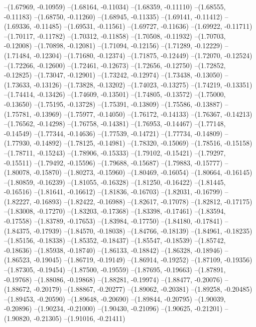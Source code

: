--(1.67969, -0.10959)
--(1.68164, -0.11034)
--(1.68359, -0.11110)
--(1.68555, -0.11183)
--(1.68750, -0.11260)
--(1.68945, -0.11335)
--(1.69141, -0.11412)
--(1.69336, -0.11485)
--(1.69531, -0.11561)
--(1.69727, -0.11636)
--(1.69922, -0.11711)
--(1.70117, -0.11782)
--(1.70312, -0.11858)
--(1.70508, -0.11932)
--(1.70703, -0.12008)
--(1.70898, -0.12081)
--(1.71094, -0.12156)
--(1.71289, -0.12229)
--(1.71484, -0.12304)
--(1.71680, -0.12374)
--(1.71875, -0.12449)
--(1.72070, -0.12524)
--(1.72266, -0.12600)
--(1.72461, -0.12673)
--(1.72656, -0.12750)
--(1.72852, -0.12825)
--(1.73047, -0.12901)
--(1.73242, -0.12974)
--(1.73438, -0.13050)
--(1.73633, -0.13126)
--(1.73828, -0.13202)
--(1.74023, -0.13275)
--(1.74219, -0.13351)
--(1.74414, -0.13426)
--(1.74609, -0.13501)
--(1.74805, -0.13572)
--(1.75000, -0.13650)
--(1.75195, -0.13728)
--(1.75391, -0.13809)
--(1.75586, -0.13887)
--(1.75781, -0.13969)
--(1.75977, -0.14050)
--(1.76172, -0.14133)
--(1.76367, -0.14213)
--(1.76562, -0.14298)
--(1.76758, -0.14381)
--(1.76953, -0.14467)
--(1.77148, -0.14549)
--(1.77344, -0.14636)
--(1.77539, -0.14721)
--(1.77734, -0.14809)
--(1.77930, -0.14892)
--(1.78125, -0.14981)
--(1.78320, -0.15069)
--(1.78516, -0.15158)
--(1.78711, -0.15243)
--(1.78906, -0.15333)
--(1.79102, -0.15421)
--(1.79297, -0.15511)
--(1.79492, -0.15596)
--(1.79688, -0.15687)
--(1.79883, -0.15777)
--(1.80078, -0.15870)
--(1.80273, -0.15960)
--(1.80469, -0.16054)
--(1.80664, -0.16145)
--(1.80859, -0.16239)
--(1.81055, -0.16328)
--(1.81250, -0.16422)
--(1.81445, -0.16516)
--(1.81641, -0.16612)
--(1.81836, -0.16703)
--(1.82031, -0.16799)
--(1.82227, -0.16893)
--(1.82422, -0.16988)
--(1.82617, -0.17078)
--(1.82812, -0.17175)
--(1.83008, -0.17270)
--(1.83203, -0.17368)
--(1.83398, -0.17461)
--(1.83594, -0.17558)
--(1.83789, -0.17653)
--(1.83984, -0.17750)
--(1.84180, -0.17841)
--(1.84375, -0.17939)
--(1.84570, -0.18038)
--(1.84766, -0.18139)
--(1.84961, -0.18235)
--(1.85156, -0.18338)
--(1.85352, -0.18437)
--(1.85547, -0.18539)
--(1.85742, -0.18636)
--(1.85938, -0.18740)
--(1.86133, -0.18842)
--(1.86328, -0.18946)
--(1.86523, -0.19045)
--(1.86719, -0.19149)
--(1.86914, -0.19252)
--(1.87109, -0.19356)
--(1.87305, -0.19454)
--(1.87500, -0.19559)
--(1.87695, -0.19663)
--(1.87891, -0.19768)
--(1.88086, -0.19868)
--(1.88281, -0.19974)
--(1.88477, -0.20076)
--(1.88672, -0.20179)
--(1.88867, -0.20277)
--(1.89062, -0.20381)
--(1.89258, -0.20485)
--(1.89453, -0.20590)
--(1.89648, -0.20690)
--(1.89844, -0.20795)
--(1.90039, -0.20896)
--(1.90234, -0.21000)
--(1.90430, -0.21096)
--(1.90625, -0.21201)
--(1.90820, -0.21305)
--(1.91016, -0.21411)
